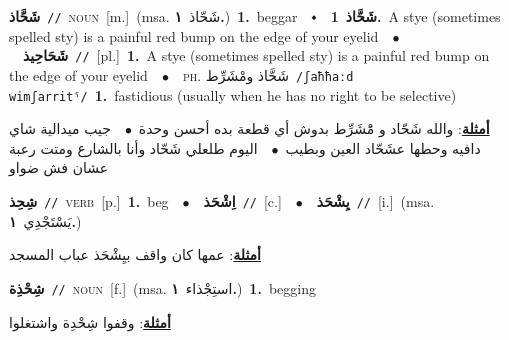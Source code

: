 \documentclass[10pt,a4paper,twoside]{article} %
\begin{document}
\begin{multicols}{2}
{\setlength\topsep{0pt}\textbf{\foreignlanguage{arabic}{شَحَّاذ}}\ {\color{gray}\texttt{//}\color{black}}\ \textsc{noun}\ [m.]\ \color{gray}(msa. \foreignlanguage{arabic}{شَحّاذ}~\foreignlanguage{arabic}{\textbf{١.}})\color{black}\ \textbf{1.}~beggar\ \ $\smblkdiamond$\ \ \setlength\topsep{0pt}\textbf{\foreignlanguage{arabic}{شَحَّاذ}}\ \textbf{1.}~A stye (sometimes spelled sty) is a painful red bump on the edge of your eyelid\ \ $\bullet$\ \ \setlength\topsep{0pt}\textbf{\foreignlanguage{arabic}{شَحَاحِيذ}}\ {\color{gray}\texttt{//}\color{black}}\ [pl.]\ \textbf{1.}~A stye (sometimes spelled sty) is a painful red bump on the edge of your eyelid\ \ $\bullet$\ \ \textsc{ph.} \color{gray} \foreignlanguage{arabic}{شَحَّاذ ومْشَرِّط}\color{black}\ {\color{gray}\texttt{/{\sffamily ʃaħħaːd wimʃarritˤ}/}\color{black}}\ \textbf{1.}~fastidious (usually when he has no right to be selective)\  \begin{flushright}\color{gray}\foreignlanguage{arabic}{\textbf{\underline{\foreignlanguage{arabic}{أمثلة}}}: والله شَحّاد و مَْشَرِّط بدوش أي قطعة بده أحسن وحدة\ $\bullet$\ \  جيب ميدالية شاي دافيه وحطها عشَحّاد العين وبطيب\ $\bullet$\ \  اليوم طلعلي شَحّاد وأنا بالشارع ومتت رعبة عشان فش ضواو}\end{flushright}\color{black}} \vspace{2mm}

{\setlength\topsep{0pt}\textbf{\foreignlanguage{arabic}{شِحِذ}}\ {\color{gray}\texttt{//}\color{black}}\ \textsc{verb}\ [p.]\ \textbf{1.}~beg\ \ $\bullet$\ \ \setlength\topsep{0pt}\textbf{\foreignlanguage{arabic}{اِشْحَذ}}\ {\color{gray}\texttt{//}\color{black}}\ [c.]\ \ $\bullet$\ \ \setlength\topsep{0pt}\textbf{\foreignlanguage{arabic}{يِشْحَذ}}\ {\color{gray}\texttt{//}\color{black}}\ [i.]\ \color{gray}(msa. \foreignlanguage{arabic}{يَسْتَجْدِي}~\foreignlanguage{arabic}{\textbf{١.}})\color{black}\  \begin{flushright}\color{gray}\foreignlanguage{arabic}{\textbf{\underline{\foreignlanguage{arabic}{أمثلة}}}: عمها كان واقف بيِشْحَذ عباب المسجد}\end{flushright}\color{black}} \vspace{2mm}

{\setlength\topsep{0pt}\textbf{\foreignlanguage{arabic}{شِحْذِة}}\ {\color{gray}\texttt{//}\color{black}}\ \textsc{noun}\ [f.]\ \color{gray}(msa. \foreignlanguage{arabic}{استِجْذاء}~\foreignlanguage{arabic}{\textbf{١.}})\color{black}\ \textbf{1.}~begging\  \begin{flushright}\color{gray}\foreignlanguage{arabic}{\textbf{\underline{\foreignlanguage{arabic}{أمثلة}}}: وقفوا شِحْدِة واشتغلوا}\end{flushright}\color{black}} \vspace{2mm}


\end{multicols}
\end{document}

